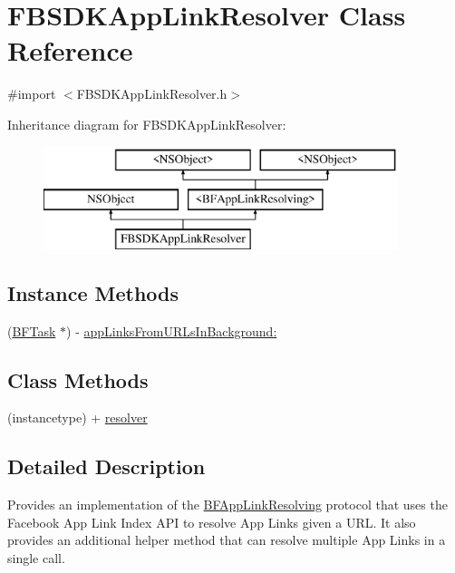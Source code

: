 \hypertarget{interface_f_b_s_d_k_app_link_resolver}{}\section{F\+B\+S\+D\+K\+App\+Link\+Resolver Class Reference}
\label{interface_f_b_s_d_k_app_link_resolver}


{\ttfamily \#import $<$F\+B\+S\+D\+K\+App\+Link\+Resolver.\+h$>$}

Inheritance diagram for F\+B\+S\+D\+K\+App\+Link\+Resolver\+:\begin{figure}[H]
\begin{center}
\leavevmode
\includegraphics[height=3.000000cm]{interface_f_b_s_d_k_app_link_resolver}
\end{center}
\end{figure}
\subsection*{Instance Methods}
\begin{DoxyCompactItemize}
\item 
(\hyperlink{class_b_f_task}{B\+F\+Task} $\ast$) -\/ \hyperlink{interface_f_b_s_d_k_app_link_resolver_a0a56680a0b2be94b85cf45a4db0ebfb5}{app\+Links\+From\+U\+R\+Ls\+In\+Background\+:}
\end{DoxyCompactItemize}
\subsection*{Class Methods}
\begin{DoxyCompactItemize}
\item 
(instancetype) + \hyperlink{interface_f_b_s_d_k_app_link_resolver_a4d9003c46f8f3156deb2c88e82ae2145}{resolver}
\end{DoxyCompactItemize}


\subsection{Detailed Description}
Provides an implementation of the \hyperlink{protocol_b_f_app_link_resolving-p}{B\+F\+App\+Link\+Resolving} protocol that uses the Facebook App Link Index A\+P\+I to resolve App Links given a U\+R\+L. It also provides an additional helper method that can resolve multiple App Links in a single call.

